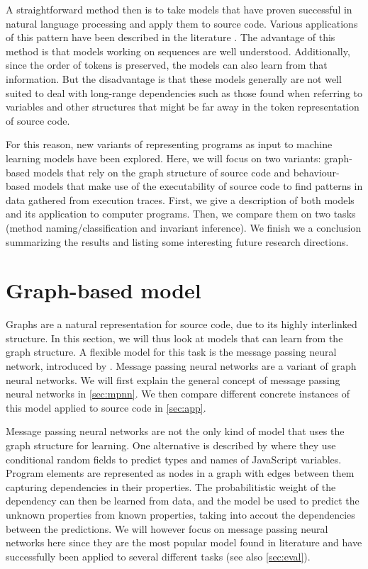 \documentclass[sigconf,authordraft=true,nonacm=true]{acmart}
\begin{document}
A straightforward method then is to take models that have proven successful in natural language processing and apply them to source code.
Various applications of this pattern have been described in the literature \cite{ahmad_transformer-based_2020,malik_nl2type_2019,alon_code2vec_2019,hellendoorn_are_2017}.
The advantage of this method is that models working on sequences are well understood.
Additionally, since the order of tokens is preserved, the models can also learn from that information.
But the disadvantage is that these models generally are not well suited to deal with long-range dependencies such as those found when referring to variables and other structures that might be far away in the token representation of source code.

For this reason, new variants of representing programs as input to machine learning models have been explored.
Here, we will focus on two variants: graph-based models that rely on the graph structure of source code and behaviour-based models that make use of the executability of source code to find patterns in data gathered from execution traces.
First, we give a description of both models and its application to computer programs.
Then, we compare them on two tasks (method naming/classification and invariant inference).
We finish we a conclusion summarizing the results and listing some interesting future research directions.

\section{Graph-based model}
Graphs are a natural representation for source code, due to its highly interlinked structure.
In this section, we will thus look at models that can learn from the graph structure.
A flexible model for this task is the message passing neural network, introduced by \citet{gilmer_neural_2017}.
Message passing neural networks are a variant of graph neural networks.
We will first explain the general concept of message passing neural networks in \cref{sec:mpnn}.
We then compare different concrete instances of this model applied to source code in \cref{sec:app}.

Message passing neural networks are not the only kind of model that uses the graph structure for learning.
One alternative is described by \citet{raychev_predicting_2019} where they use conditional random fields to predict types and names of JavaScript variables.
Program elements are represented as nodes in a graph with edges between them capturing dependencies in their properties.
The probabilitistic weight of the dependency can then be learned from data, and the model be used to predict the unknown properties from known properties, taking into accout the dependencies between the predictions.
We will however focus on message passing neural networks here since they are the most popular model found in literature and have successfully been applied to several different tasks (see also \cref{sec:eval}).
\end{document}
